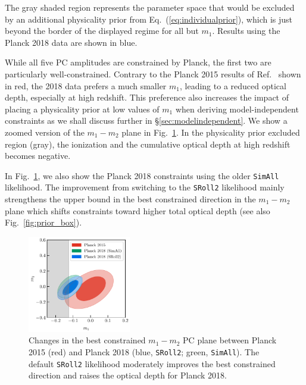 \documentclass[aps,prd,twocolumn,amsmath,amssymb,showpacs,floatfix,superscriptaddress,nofootinbib]{revtex4-1}
\newcommand{\wh}[1]{\textcolor{blue}{#1}}
\begin{document}
%
%
%
%
The gray shaded region 
represents the parameter space that would be excluded by an additional 
physicality prior from Eq.~(\ref{eq:individualprior}),
which is just beyond the border of the displayed regime for all but $m_1$. Results using the Planck 2018 data are shown in blue. 

While all five PC amplitudes are  constrained by Planck, the first two are particularly well-constrained. Contrary to the Planck 2015 results of Ref.~\cite{Heinrich:2016ojb} shown in red, the 2018 data prefers a much smaller $m_1$, leading to a reduced optical depth, especially at high redshift.  
This preference also increases the impact of placing a physicality prior at low values of $m_1$ when deriving model-independent constraints as we shall discuss further in \S \ref{sec:modelindependent}.
We show a zoomed version of the $m_1-m_2$ plane in Fig.~\ref{fig:plot_m1m2_2015_vs_2018}.
In the physicality prior excluded region (gray), the ionization and the cumulative optical depth at high redshift becomes negative.

In Fig.~\ref{fig:plot_m1m2_2015_vs_2018}, we also show
the Planck 2018 constraints using the older \texttt{SimAll} likelihood.  The improvement 
from switching to the \texttt{SRoll2} likelihood mainly strengthens the upper bound in the best constrained direction in the $m_1-m_2$ plane which shifts constraints toward higher total optical depth (see also Fig.~\ref{fig:prior_box}).


\begin{figure}
\includegraphics[width=0.4\textwidth]{plot_m1_m2_t18_r12_t19_t20_vs_pl18_pc_zmax30_pliklite_0930_vs_pl18_pc_zmax30_pliklite_srollv2_1015.pdf}
\caption{Changes in the best constrained $m_1-m_2$ PC plane between Planck 2015 (red) and Planck 2018 (blue,  \texttt{SRoll2}; green, \texttt{SimAll}). The default \texttt{SRoll2} likelihood moderately improves the best constrained direction  and raises the optical depth for Planck 2018.}
\label{fig:plot_m1m2_2015_vs_2018}
\end{figure}
\end{document}
